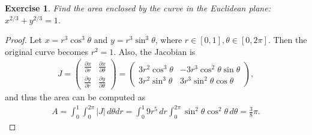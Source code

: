 \documentclass[11pt]{article}
\newtheorem{exercise}{Exercise}[section]
\theoremstyle{definition}
\numberwithin{equation}{subsection}
\begin{document}
\medskip

\begin{exercise}
Find the area enclosed by the curve in the Euclidean plane: $\displaystyle x^{2/3} + y^{2/3} = 1$.
\end{exercise}
\begin{proof}
Let $x = r^3 \cos^3 \theta$ and $y = r^3 \sin^3 \theta$, where $r \in [0,1], \theta \in [0, 2\pi]$. Then the original curve becomes $r^2 = 1$. Also, the Jacobian is
\begin{align*}
    J = \begin{pmatrix}
        \displaystyle \frac{\partial x}{\partial r} & \displaystyle  \frac{\partial x}{\partial \theta} \\
        \displaystyle \frac{\partial y}{\partial r} & \displaystyle  \frac{\partial y}{\partial \theta}
    \end{pmatrix} =  \begin{pmatrix}
        3r^2 \cos^3 \theta & -3r^3 \cos^2 \theta \sin \theta \\
        3r^2 \sin^3 \theta & 3r^3 \sin^2 \theta \cos \theta 
    \end{pmatrix},
\end{align*}
and thus the area can be computed as
\begin{align*}
    A = \int^1_0 \int^{2\pi}_0 |J|\, d\theta dr = \int^1_0 9r^5\, dr \int^{2\pi}_0 \sin^2 \theta \cos^2 \theta \, d\theta = \frac{3}{8} \pi.
\end{align*}
\end{proof}

\medskip
\end{document}
